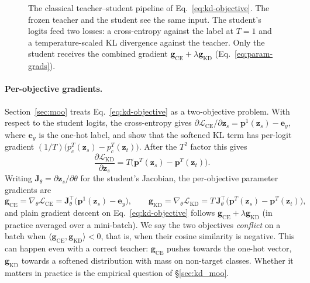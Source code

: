 \begin{figure}[t]
  \centering
  \resizebox{0.9\linewidth}{!}{}
  \caption{The classical teacher--student pipeline of Eq.~\eqref{eq:kd-objective}. The frozen teacher and
  the student see the same input. The student's logits feed two losses: a cross-entropy against the
  label at $T=1$ and a temperature-scaled KL divergence against the teacher. Only the student receives
  the combined gradient $\mathbf{g}_{\mathrm{CE}}+\lambda\mathbf{g}_{\mathrm{KD}}$ (Eq.~\eqref{eq:param-grads}).}
  \label{fig:kd-pipeline}
\end{figure}

\paragraph{Per-objective gradients.}
Section~\ref{sec:moo} treats Eq.~\eqref{eq:kd-objective} as a two-objective problem. With respect to
the student logits, the cross-entropy gives
$\partial\mathcal{L}_{\mathrm{CE}}/\partial\mathbf{z}_s = \mathbf{p}^{1}(\mathbf{z}_s) - \mathbf{e}_y$,
where $\mathbf{e}_y$ is the one-hot label, and \citet{hinton2015kd} show that the softened KL term has
per-logit gradient $(1/T)\big(p^{T}_{c}(\mathbf{z}_s) - p^{T}_{c}(\mathbf{z}_t)\big)$. After the $T^2$
factor this gives
\begin{equation}
  \label{eq:logit-grads}
  \frac{\partial\mathcal{L}_{\mathrm{KD}}}{\partial\mathbf{z}_s} = T\big(\mathbf{p}^{T}(\mathbf{z}_s) - \mathbf{p}^{T}(\mathbf{z}_t)\big).
\end{equation}
Writing $\mathbf{J}_\theta = \partial\mathbf{z}_s/\partial\theta$ for the student's Jacobian, the
per-objective parameter gradients are
\begin{equation}
  \label{eq:param-grads}
  \mathbf{g}_{\mathrm{CE}} = \nabla_\theta\mathcal{L}_{\mathrm{CE}} = \mathbf{J}_\theta^{\top}\big(\mathbf{p}^{1}(\mathbf{z}_s)-\mathbf{e}_y\big),
  \qquad
  \mathbf{g}_{\mathrm{KD}} = \nabla_\theta\mathcal{L}_{\mathrm{KD}} = T\,\mathbf{J}_\theta^{\top}\big(\mathbf{p}^{T}(\mathbf{z}_s)-\mathbf{p}^{T}(\mathbf{z}_t)\big),
\end{equation}
and plain gradient descent on Eq.~\eqref{eq:kd-objective} follows $\mathbf{g}_{\mathrm{CE}}+\lambda\mathbf{g}_{\mathrm{KD}}$
(in practice averaged over a mini-batch). We say the two objectives \emph{conflict} on a batch when
$\langle\mathbf{g}_{\mathrm{CE}},\mathbf{g}_{\mathrm{KD}}\rangle < 0$, that is, when their cosine
similarity is negative. This can happen even with a correct teacher: $\mathbf{g}_{\mathrm{CE}}$ pushes
towards the one-hot vector, $\mathbf{g}_{\mathrm{KD}}$ towards a softened distribution with mass on
non-target classes. Whether it matters in practice is the empirical question of \S\ref{sec:kd_moo}.


